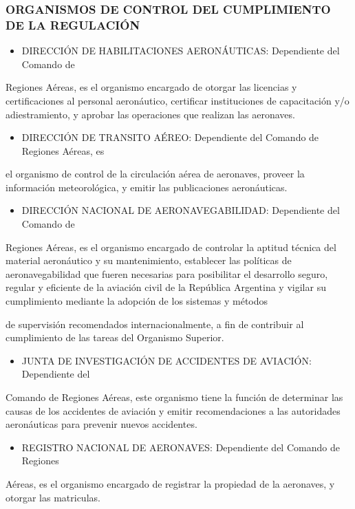 \subsubsection*{ORGANISMOS DE CONTROL DEL CUMPLIMIENTO DE LA REGULACIÓN}
\begin{itemize}
  \item DIRECCIÓN DE HABILITACIONES AERONÁUTICAS: Dependiente del Comando de
\end{itemize}
Regiones Aéreas, es el organismo encargado de otorgar las licencias y certificaciones al personal aeronáutico, certificar instituciones de capacitación y/o adiestramiento, y aprobar las operaciones que realizan las aeronaves.

\begin{itemize}
  \item DIRECCIÓN DE TRANSITO AÉREO: Dependiente del Comando de Regiones Aéreas, es
\end{itemize}
el organismo de control de la circulación aérea de aeronaves, proveer la información meteorológica, y emitir las publicaciones aeronáuticas.

\begin{itemize}
  \item DIRECCIÓN NACIONAL DE AERONAVEGABILIDAD: Dependiente del Comando de
\end{itemize}
Regiones Aéreas, es el organismo encargado de controlar la aptitud técnica del material aeronáutico y su mantenimiento, establecer las políticas de aeronavegabilidad que fueren necesarias para posibilitar el desarrollo seguro, regular y eficiente de la aviación civil de la República Argentina y vigilar su cumplimiento mediante la adopción de los sistemas y métodos



de supervisión recomendados internacionalmente, a fin de contribuir al cumplimiento de las tareas del Organismo Superior.

\begin{itemize}
  \item JUNTA DE INVESTIGACIÓN DE ACCIDENTES DE AVIACIÓN: Dependiente del
\end{itemize}
Comando de Regiones Aéreas, este organismo tiene la función de determinar las causas de los accidentes de aviación y emitir recomendaciones a las autoridades aeronáuticas para prevenir nuevos accidentes.

\begin{itemize}
  \item REGISTRO NACIONAL DE AERONAVES: Dependiente del Comando de Regiones
\end{itemize}
Aéreas, es el organismo encargado de registrar la propiedad de la aeronaves, y otorgar las matriculas.

